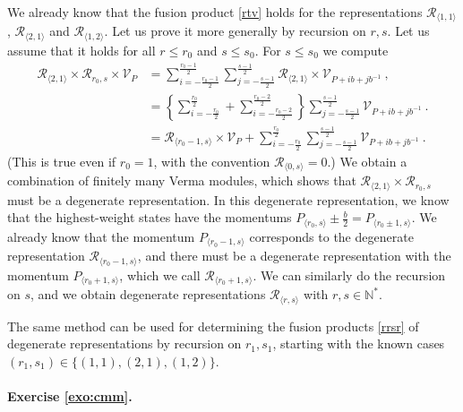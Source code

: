 \documentclass[12pt, a4paper]{article}
\theoremstyle{break}
\begin{document}
We already know that the fusion product \eqref{rtv} holds for the representations $\mathcal{R}_{\langle 1,1\rangle}$, $\mathcal{R}_{\langle 2,1\rangle}$ and $\mathcal{R}_{\langle 1,2\rangle}$. Let us prove it more generally by recursion on $r,s$. Let us assume that it holds for all $r\leq r_0$ and $s\leq s_0$. For $s\leq s_0$ we compute 
\begin{align}
 \mathcal{R}_{\langle 2,1\rangle} \times \mathcal{R}_{r_0, s} \times \mathcal{V}_P 
 &= \sum_{i=-\frac{r_0-1}{2}}^{\frac{r_0-1}{2}} 
 \sum_{j=-\frac{s-1}{2}}^{\frac{s-1}{2}}  
 \mathcal{R}_{\langle 2,1\rangle} \times \mathcal{V}_{P + ib+jb^{-1}} \ ,
 \\
 &= \left\{\sum_{i=-\frac{r_0}{2}}^{\frac{r_0}{2}} + \sum_{i=-\frac{r_0-2}{2}}^{\frac{r_0-2}{2}} \right\}
 \sum_{j=-\frac{s-1}{2}}^{\frac{s-1}{2}} \mathcal{V}_{P + ib+jb^{-1}} \ .
 \\
 &= \mathcal{R}_{\langle r_0-1,s\rangle} \times \mathcal{V}_P + \sum_{i=-\frac{r_0}{2}}^{\frac{r_0}{2}}\sum_{j=-\frac{s-1}{2}}^{\frac{s-1}{2}} \mathcal{V}_{P + ib+jb^{-1}} \ .
\end{align}
(This is true even if $r_0=1$, with the convention $\mathcal{R}_{\langle 0,s\rangle}=0$.) We obtain a combination of finitely many Verma modules, which shows that $\mathcal{R}_{\langle 2,1\rangle} \times \mathcal{R}_{r_0, s} $ must be a degenerate representation. In this degenerate representation, we know that the highest-weight states have the momentums $P_{\langle r_0, s\rangle} \pm \frac{b}{2} = P_{\langle r_0\pm 1,s\rangle}$. We already know that the momentum $P_{\langle r_0-1,s\rangle}$ corresponds to the degenerate representation $\mathcal{R}_{\langle r_0-1,s\rangle}$, and there must be a degenerate representation with the momentum  $P_{\langle r_0+1,s\rangle}$, which we call $\mathcal{R}_{\langle r_0+1,s\rangle}$. We can similarly do the recursion on $s$, and we obtain degenerate representations $\mathcal{R}_{\langle r,s\rangle}$ with $r,s\in\mathbb{N}^*$.

The same method can be used for determining the fusion products \eqref{rrsr} of degenerate representations by recursion on $r_1,s_1$, starting with the known cases $(r_1,s_1)\in \{(1,1), (2,1), (1,2)\}$.

\paragraph{Exercise \ref{exo:cmm}.} 
\end{document}
